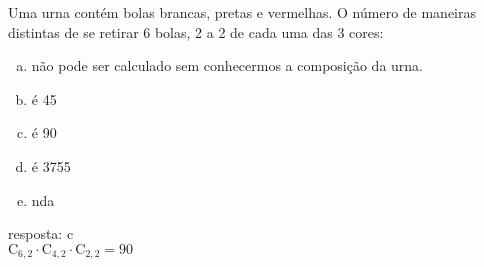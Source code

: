 \begin{ex}
 Uma urna contém bolas brancas, pretas e vermelhas. O número de maneiras distintas de se retirar 6 bolas, 2 a 2 de cada uma das 3 cores:
    \begin{enumerate}[(a)]
    \item não pode ser calculado sem conhecermos a composição da urna.
    \item é 45
    \item é 90
    \item é 3755
    \item nda
    \end{enumerate}
      \begin{sol}
        resposta: c \\
        $\mathrm{C}_{6,2}\cdot\mathrm{C}_{4,2}\cdot\mathrm{C}_{2,2}=90$
      \end{sol}
\end{ex}